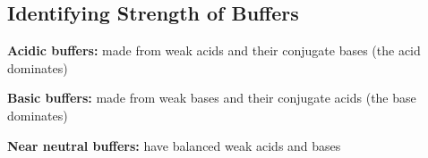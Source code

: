 \subsection{Identifying Strength of Buffers}
\begin{bulleted-list}
    \item \textbf{Acidic buffers:} made from weak acids and their conjugate bases (the acid dominates)
    \item \textbf{Basic buffers:} made from weak bases and their conjugate acids (the base dominates)
    \item \textbf{Near neutral buffers:} have balanced weak acids and bases
\end{bulleted-list}
